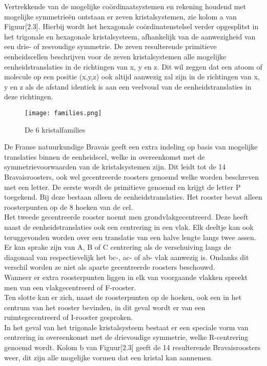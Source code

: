 \par 
Vertrekkende van de mogelijke coördinaatsystemen en rekening houdend met mogelijke symmetrieën ontstaan er zeven kristalsystemen, zie kolom a van Figuur[2.3]. Hierbij wordt het hexagonale coördinatenstelsel verder opgesplitst in het trigonale en hexagonale kristalsysteem, afhankelijk van de aanwezigheid van een drie- of zesvoudige symmetrie. De zeven resulterende primitieve eenheidscellen beschrijven  voor de zeven kristalsystemen alle mogelijke eenheidstranslaties in de richtingen van x, y en z. Dit wil zeggen dat een atoom of molecule op een positie (x,y,z) ook altijd aanwezig zal zijn in de richtingen van x, y en z als de afstand identiek is aan een veelvoud van de eenheidstranslaties in deze richtingen.

\begin{figure}[H]
\texttt{[image: families.png]}
\caption{De 6 kristalfamilies}
\end{figure}

\par   
De Franse natuurkundige Bravais \citep*{BRAV} geeft een extra indeling op basis van mogelijke translaties binnen de eenheidscel, welke in overeenkomst met de symmetrievoorwaarden van de kristalsystemen zijn. Dit leidt tot de 14 Bravaisroosters, ook wel gecentreerde roosters genoemd welke worden beschreven met een letter. 
De eerste wordt de primitieve genoemd en krijgt de letter P toegekend. Bij deze bestaan alleen de eenheidstranslaties. Het rooster bevat alleen roosterpunten op de 8 hoeken van de cel.
\\
Het tweede gecentreerde rooster noemt men grondvlakgecentreerd. Deze heeft naast de eenheidstranslaties ook een centrering in een vlak. Elk deeltje kan ook teruggevonden worden over een translatie van een halve lengte langs twee assen. Er kan sprake zijn van A, B of C centrering als de verschuiving langs de diagonaal van respectievelijk het bc-, ac- of ab- vlak aanwezig is. Ondanks dit verschil worden ze niet als aparte gecentreerde roosters beschouwd.   
\\
Wanneer er extra roosterpunten liggen in elk van voorgaande vlakken spreekt men van een vlakgecentreerd of F-rooster. 
\\
Ten slotte kan er zich, naast de roosterpunten op de hoeken, ook een in het centrum van het rooster bevinden, in dit geval wordt er van een ruimtegecentreerd of I-rooster gesproken. 
\\
In het geval van het trigonale kristalsysteem bestaat er een speciale vorm van centrering in overeenkomst met de drievoudige symmetrie, welke R-centrering genoemd wordt. Kolom b van Figuur[2.3] geeft de 14 resulterende Bravaisroosters weer, dit zijn alle mogelijke vormen dat een kristal kan aannemen.
 
